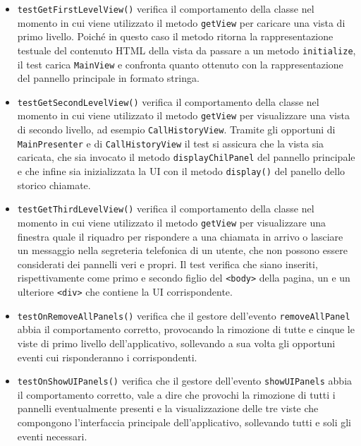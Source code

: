 \begin{itemize}
\begin{itemize}
\item \texttt{testGetFirstLevelView()} verifica il comportamento della classe nel momento in cui viene utilizzato il metodo \verb'getView' per caricare una vista di primo livello. Poiché in questo caso il metodo ritorna la rappresentazione testuale del contenuto HTML della vista da passare a un metodo \verb'initialize', il test carica \verb'MainView' e confronta quanto ottenuto con la rappresentazione del pannello principale in formato stringa.

\item \texttt{testGetSecondLevelView()} verifica il comportamento della classe nel momento in cui viene utilizzato il metodo \verb'getView' per visualizzare una vista di secondo livello, ad esempio \verb'CallHistoryView'. Tramite gli opportuni  di \verb'MainPresenter' e di \verb'CallHistoryView' il test si assicura che la vista sia caricata, che sia invocato il metodo \verb'displayChilPanel' del pannello principale e che infine sia inizializzata la UI con il metodo \verb'display()' del panello dello storico chiamate. 

\item \texttt{testGetThirdLevelView()} verifica il comportamento della classe nel momento in cui viene utilizzato il metodo \verb'getView' per visualizzare una finestra  quale il riquadro per rispondere a una chiamata in arrivo o lasciare un messaggio nella segreteria telefonica di un utente, che non possono essere considerati dei pannelli veri e propri. Il test verifica che siano inseriti, rispettivamente come primo e secondo figlio del \verb'<body>' della pagina, un  e un ulteriore \verb'<div>' che contiene la UI corrispondente.

\item \texttt{testOnRemoveAllPanels()} verifica che il gestore dell'evento \verb'removeAllPanel' abbia il comportamento corretto, provocando la rimozione di tutte e cinque le viste di primo livello dell'applicativo, sollevando a sua volta gli opportuni eventi cui risponderanno i  corrispondenti.

\item \texttt{testOnShowUIPanels()} verifica che il gestore dell'evento \verb'showUIPanels' abbia il comportamento corretto, vale a dire che provochi la rimozione di tutti i pannelli eventualmente presenti e la visualizzazione delle tre viste che compongono l'interfaccia principale dell'applicativo, sollevando tutti e soli gli eventi necessari.
\end{itemize}


\end{itemize}
